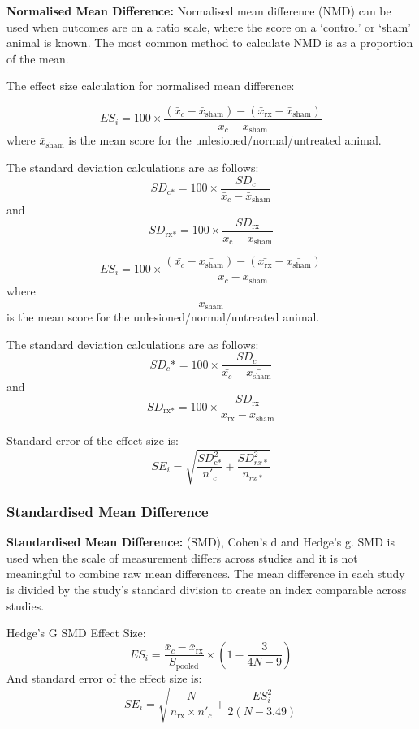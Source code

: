 \documentclass[
]{book}
\begin{document}
\textbf{Normalised Mean Difference:} Normalised mean difference (NMD) can be used when outcomes are on a ratio scale, where the score on a `control' or `sham' animal is known. The most common method to calculate NMD is as a proportion of the mean.

The effect size calculation for normalised mean difference:

\[ES_i= 100 \times  \frac {(\bar{x}_c - \bar{x}_\text{sham}) - (\bar{x}_\text{rx} - \bar{x}_\text{sham})}{\bar{x}_c - \bar{x}_\text{sham}}\] where \(\bar{x}_\text{sham}\) is the mean score for the unlesioned/normal/untreated animal.

The standard deviation calculations are as follows:
\[SD_\text{c*} = 100 \times \frac {SD_c}{\bar{x}_c - \bar{x}_\text{sham}}\] and \[SD_\text{rx*} = 100 \times \frac {SD_\text{rx}}{\bar{x}_\text{c} - \bar{x}_\text{sham}}\]

\[ES_i= 100 \times  \frac {(\bar{x_c} - \bar{x_\text{sham}}) - (\bar{x_\text{rx}} - \bar{x_\text{sham}})}{\bar{x_c} - \bar{x_\text{sham}}} \] where \[\bar{x_\text{sham}} \] is the mean score for the unlesioned/normal/untreated animal.

The standard deviation calculations are as follows:
\[SD_c* = 100 \times \frac {SD_c}{\bar{x_c} - \bar{x_\text{sham}}}\] and \[SD_\text{rx*} = 100 \times \frac {SD_\text{rx}}{\bar{x_\text{rx}} - \bar{x_\text{sham}}}\]

Standard error of the effect size is:
\[SE_i = \sqrt{ \frac{SD_\text{c*}^2}{n'_c} + \frac {SD_{rx*}^2}{n_{rx*}} }\]

\hypertarget{standardised-mean-difference}{%
\subsubsection{Standardised Mean Difference}\label{standardised-mean-difference}}

\textbf{Standardised Mean Difference:} (SMD), Cohen's d and Hedge's g. SMD is used when the scale of measurement differs across studies and it is not meaningful to combine raw mean differences. The mean difference in each study is divided by the study's standard division to create an index comparable across studies.

Hedge's G SMD Effect Size:
\[ES_i = \frac {\bar{x}_c - \bar{x}_\text{rx}}{S_{\text{pooled}}} \times (1 - \frac{3}{4N - 9})  \]
And standard error of the effect size is:
\[ SE_i = \sqrt{ \frac{N}{n_{\text{rx}} \times n'_c} + \frac{ES_i^2}{2(N - 3.49)} }\]
\end{document}

